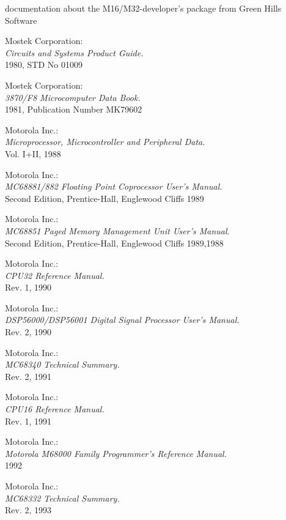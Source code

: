  documentation about the M16/M32-developer's package
		from Green Hills Software

 Mostek Corporation: \\
		{\em Circuits and Systems Product Guide.\/} \\
		1980, STD No 01009

 Mostek Corporation: \\
		{\em 3870/F8 Microcomputer Data Book.\/} \\
		1981, Publication Number MK79602

 Motorola Inc.: \\
		{\em Microprocessor, Microcontroller and Peripheral
		Data.\/} \\
		Vol. I+II, 1988

 Motorola Inc.: \\
		{\em MC68881/882 Floating Point Coprocessor User's
		Manual.\/} \\
		Second Edition, Prentice-Hall, Englewood Cliffs 1989

 Motorola Inc.: \\
		{\em MC68851 Paged Memory Management Unit User's
		Manual.\/} \\
		Second Edition, Prentice-Hall, Englewood Cliffs 1989,1988

 Motorola Inc.: \\
		{\em CPU32 Reference Manual.\/} \\
		Rev. 1, 1990

 Motorola Inc.: \\
		{\em DSP56000/DSP56001 Digital Signal Processor User's
		Manual.\/} \\
		Rev. 2, 1990

 Motorola Inc.: \\
		{\em MC68340 Technical Summary.\/} \\
		Rev. 2, 1991

 Motorola Inc.: \\
		{\em CPU16 Reference Manual.\/} \\
		Rev. 1, 1991

 Motorola Inc.: \\
		{\em Motorola M68000 Family Programmer's
		Reference Manual.\/} \\
		1992

 Motorola Inc.: \\
		{\em MC68332 Technical Summary.\/} \\
		Rev. 2, 1993

